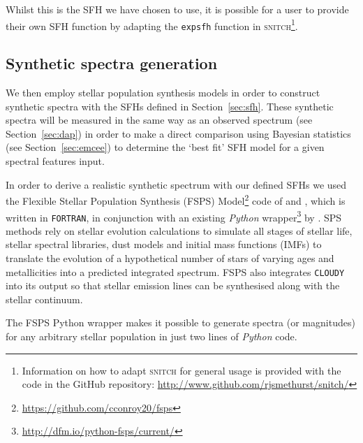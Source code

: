 \documentclass[useAMS,usenatbib]{mn2e}
\begin{document}
Whilst this is the SFH we have chosen to use, it is possible for a user to provide their own SFH function by adapting the \texttt{expsfh} function in \textsc{snitch}\footnote{Information on how to adapt \textsc{snitch} for general usage is provided with the code in the GitHub repository: \url{http://www.github.com/rjsmethurst/snitch/}}.

\subsection{Synthetic spectra generation}\label{sec:fsps}

We then employ stellar population synthesis models in order to construct synthetic spectra with the SFHs defined in Section~\ref{sec:sfh}. These synthetic spectra will be measured in the same way as an observed spectrum (see Section~\ref{sec:dap}) in order to make a direct comparison using Bayesian statistics (see Section~\ref{sec:emcee}) to determine the `best fit' SFH model for a given spectral features input. 

In order to derive a realistic synthetic spectrum with our defined SFHs we used the Flexible Stellar Population Synthesis (FSPS) Model\footnote{\url{https://github.com/cconroy20/fsps}} code of \cite{conroy09} and \citet{conroy10}, which is written in \texttt{FORTRAN}, in conjunction with an existing \emph{Python} wrapper\footnote{\url{http://dfm.io/python-fsps/current/}} by \cite{python_fsps}. SPS methods rely on stellar evolution calculations to simulate all stages of stellar life, stellar spectral libraries, dust models and initial mass functions (IMFs) to translate the evolution of a hypothetical number of stars of varying ages and metallicities into a predicted integrated spectrum. FSPS also integrates \texttt{CLOUDY} \citep{ferland13} into its output so that stellar emission lines can be synthesised along with the stellar continuum. 

The FSPS Python wrapper makes it possible to generate spectra (or magnitudes) for any arbitrary stellar population in just two lines of \emph{Python} code. 

\end{document}
